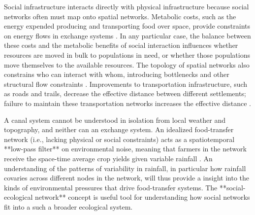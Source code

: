 \documentclass[fleqn,10pt]{wlscirep}
\begin{document}
Social infrastructure interacts directly with physical infrastructure because social networks often must map onto spatial networks. Metabolic costs, such as the energy expended producing and transporting food over space, provide constraints on energy flows in exchange systems \cite{Drennan1984}. In any particular case, the balance between these costs and the metabolic benefits of social interaction influences whether resources are moved in bulk to populations in need, or whether those populations move themselves to the available resources. The topology of spatial networks also constrains who can interact with whom, introducing bottlenecks and other structural flow constraints \cite{Barthelemy2011SpatialNetworks}. Improvements to transportation infrastructure, such as roads and trails, decrease the effective distance between different settlements; failure to maintain these transportation networks increases the effective distance \cite{McCall1985TheAfrica}.

A canal system cannot be understood in isolation from local weather and topography, and neither can an exchange system. An idealized food-transfer network (i.e., lacking physical or social constraints) acts as a spatiotemporal **low-pass filter** on environmental noise, meaning that farmers in the network receive the space-time average crop yields given variable rainfall \cite{Harpending1977}. An understanding of the patterns of variability in rainfall, in particular how rainfall covaries across different nodes in the network, will thus provide a insight into the kinds of environmental pressures that drive food-transfer systems. The **social-ecological network** concept is useful tool for understanding how social networks fit into a such a broader ecological system.


\end{document}
